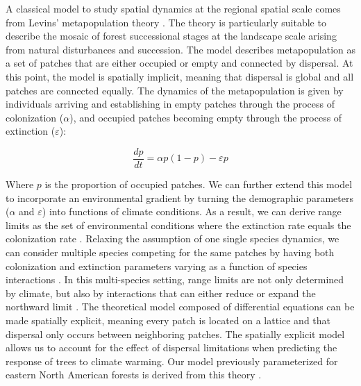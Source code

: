 A classical model to study spatial dynamics at the regional spatial
scale comes from Levins' metapopulation theory \citep{Levins1969}. The
theory is particularly suitable to describe the mosaic of forest
successional stages at the landscape scale arising from natural
disturbances and succession. The model describes metapopulation as a set
of patches that are either occupied or empty and connected by dispersal.
At this point, the model is spatially implicit, meaning that dispersal
is global and all patches are connected equally. The dynamics of the
metapopulation is given by individuals arriving and establishing in
empty patches through the process of colonization (\(\alpha\)), and
occupied patches becoming empty through the process of extinction
(\(\varepsilon\)):

\[
\frac{dp}{dt} = \alpha p (1 - p) - \varepsilon p
\]

Where \(p\) is the proportion of occupied patches. We can further extend
this model to incorporate an environmental gradient by turning the
demographic parameters (\(\alpha\) and \(\varepsilon\)) into functions
of climate conditions. As a result, we can derive range limits as the
set of environmental conditions where the extinction rate equals the
colonization rate \citep{Holt2005}. Relaxing the assumption of one
single species dynamics, we can consider multiple species competing for
the same patches by having both colonization and extinction parameters
varying as a function of species interactions \citep{Gravel2020}. In
this multi-species setting, range limits are not only determined by
climate, but also by interactions that can either reduce or expand the
northward limit \citep{Godsoe2017}. The theoretical model composed of
differential equations can be made spatially explicit, meaning every
patch is located on a lattice and that dispersal only occurs between
neighboring patches. The spatially explicit model allows us to account
for the effect of dispersal limitations when predicting the response of
trees to climate warming. Our model previously parameterized for eastern
North American forests is derived from this theory \citep{Vissault2020}.

